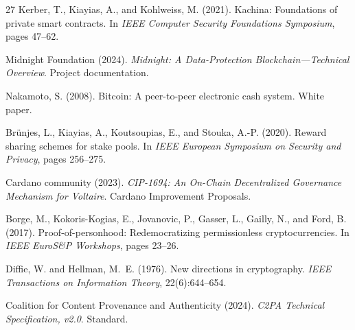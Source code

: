 \documentclass[11pt]{article}
\begin{document}
\begin{thebibliography}{27}
Kerber, T., Kiayias, A., and Kohlweiss, M. (2021). Kachina: Foundations
of private smart contracts. In \emph{IEEE Computer Security Foundations
Symposium}, pages 47--62.

Midnight Foundation (2024). \emph{Midnight: A Data-Protection
Blockchain---Technical Overview}. Project documentation.

Nakamoto, S. (2008). Bitcoin: A peer-to-peer electronic cash system.
White paper.

Br\"unjes, L., Kiayias, A., Koutsoupias, E., and Stouka, A.-P. (2020).
Reward sharing schemes for stake pools. In \emph{IEEE European Symposium
on Security and Privacy}, pages 256--275.

Cardano community (2023). \emph{CIP-1694: An On-Chain Decentralized
Governance Mechanism for Voltaire}. Cardano Improvement Proposals.

Borge, M., Kokoris-Kogias, E., Jovanovic, P., Gasser, L., Gailly, N., and
Ford, B. (2017). Proof-of-personhood: Redemocratizing permissionless
cryptocurrencies. In \emph{IEEE EuroS\&P Workshops}, pages 23--26.

Diffie, W. and Hellman, M.~E. (1976). New directions in cryptography.
\emph{IEEE Transactions on Information Theory}, 22(6):644--654.

Coalition for Content Provenance and Authenticity (2024). \emph{C2PA
Technical Specification, v2.0}. Standard.

\end{thebibliography}
\end{document}
